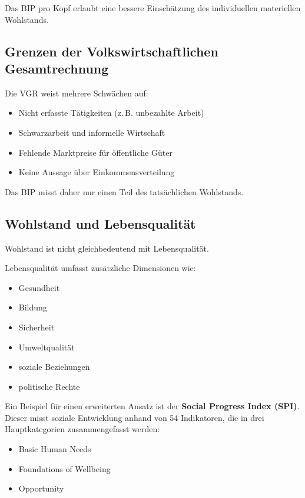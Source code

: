 Das BIP pro Kopf erlaubt eine bessere Einschätzung des individuellen 
materiellen Wohlstands.

\subsection{Grenzen der Volkswirtschaftlichen Gesamtrechnung}

Die VGR weist mehrere Schwächen auf:

\begin{itemize}
    \item Nicht erfasste Tätigkeiten (z.\,B. unbezahlte Arbeit)
    \item Schwarzarbeit und informelle Wirtschaft
    \item Fehlende Marktpreise für öffentliche Güter
    \item Keine Aussage über Einkommensverteilung
\end{itemize}

Das BIP misst daher nur einen Teil des tatsächlichen Wohlstands.

\subsection{Wohlstand und Lebensqualität}

Wohlstand ist nicht gleichbedeutend mit Lebensqualität.

Lebensqualität umfasst zusätzliche Dimensionen wie:

\begin{itemize}
    \item Gesundheit
    \item Bildung
    \item Sicherheit
    \item Umweltqualität
    \item soziale Beziehungen
    \item politische Rechte
\end{itemize}

Ein Beispiel für einen erweiterten Ansatz ist der \textbf{Social Progress Index (SPI)}. 
Dieser misst soziale Entwicklung anhand von 54 Indikatoren, die in drei Hauptkategorien 
zusammengefasst werden:

\begin{itemize}
    \item Basic Human Needs
    \item Foundations of Wellbeing
    \item Opportunity
\end{itemize}

